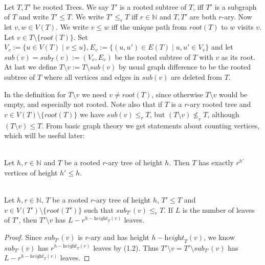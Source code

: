\documentclass[12pt]{article}
\newcommand{\he}[0]{\textit{height}}
\newcommand{\ro}[0]{\textit{root}}
\newcommand{\SUB}[0]{\textit{sub}}
\newenvironment{statement3}[3]{\begin{trivlist}
\item[\hskip \labelsep {\bfseries #1}\hskip \labelsep {\bfseries #2} {#3}\textbf{.}]}{\end{trivlist}}
\begin{document}
\begin{statement3}{(1.1)}{Definition}{(Subtrees and Ordering)}\strut\\[2pt]
    Let $T, T'$ be rooted Trees. We say $T'$ is a rooted subtree of $T$, iff $T'$ is a subgraph of $T$ and write
    $T' \leq T$. We write $T' \leq_r T$ iff $r \in \mathbb{N}$ and $T,T'$ are both $r$-ary.
    Now let $v,w \in V(T)$. We write $v \leq w$ iff the unique path from $\ro(T)$ to $w$ visits $v$.
    Let $v \in T \setminus \{\ro(T)\}$. Set
    $V_v := \{u \in V(T) \mid v \leq u\}, E_v := \{(u,u') \in E(T) \mid u,u' \in V_v\}$
    and let $\SUB(v) = \SUB_T(v) := (V_v, E_v)$ be the rooted subtree of $T$ with $v$ as its root.
    At last we define $T \setminus v := T \setminus \SUB(v)$ by usual graph difference to be the rooted subtree of $T$
    where all vertices and edges in $\SUB(v)$ are deleted from $T$.
\end{statement3}

\newpage

In the definition for $T \setminus v$ we need $v \neq \ro(T)$, since otherwise $T \setminus v$ would be empty, and especially
not rooted.
Note also that if $T$ is a $r$-ary rooted tree and $v \in V(T) \setminus \{\ro(T)\}$ we have
$\SUB(v) \leq_r T$, but $(T \setminus v) \not\leq_r T$, although $(T \setminus v) \leq T$.
From basic graph theory we get statements about counting vertices, which will be useful later:

\begin{statement3}{(1.2)}{Remark}{(Number of vertices of some height in rooted r-ary Trees)}\strut\\[2pt]
    Let $h,r \in \mathbb{N}$ and $T$ be a rooted $r$-ary tree of height $h$.
    Then $T$ has exactly $r^{h'}$ vertices of height $h' \leq h$.
\end{statement3}

\begin{statement3}{(1.3)}{Corollary}{(Number of Leaves of $T \setminus v$)}\strut\\[2pt]
    Let $h,r \in \mathbb{N}$, $T$ be a rooted $r$-ary tree of height $h$, $T' \leq T$ and
    $v \in V(T') \setminus \{\ro(T')\}$ such that $\SUB_{T'}(v) \leq_r T$.
    If $L$ is the number of leaves of $T'$, then $T' \setminus v$ has $L - r^{h - \he_T(v)}$ leaves.

    \begin{proof}
        Since $\SUB_{T'}(v)$ is $r$-ary and has height $h - \he_T(v)$, we know $\SUB_{T'}(v)$ has
        $r^{h- \he_T(v)}$ leaves by (1.2).
        Thus $T' \setminus v = T' \setminus \SUB_{T'}(v)$ has $L - r^{h-\he_T(v)}$ leaves.
    \end{proof}
\end{statement3}
\end{document}
